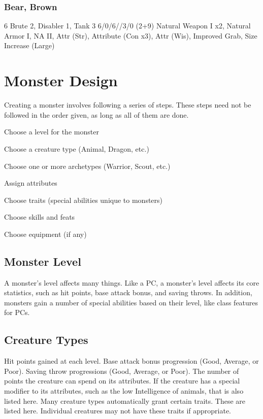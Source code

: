 \subsubsection{Bear, Brown}
 6
 Brute 2, Disabler 1, Tank 3
 6/0/6//3/0
 (2+9) Natural Weapon I x2, Natural Armor I, NA II, Attr (Str), Attribute (Con x3), Attr (Wis), Improved Grab, Size Increase (Large)

\section{Monster Design}

Creating a monster involves following a series of steps. These steps need not be followed in the order given, as long as all of them are done.

\begin{enumerate*}
    \item Choose a level for the monster
    \item Choose a creature type (Animal, Dragon, etc.)
    \item Choose one or more archetypes (Warrior, Scout, etc.)
    \item Assign attributes
    \item Choose traits (special abilities unique to monsters)
    \item Choose skills and feats
    \item Choose equipment (if any)
\end{enumerate*}

\subsection{Monster Level}
A monster's level affects many things. Like a PC, a monster's level affects its core statistics, such as hit points, base attack bonus, and saving throws. In addition, monsters gain a number of special abilities based on their level, like class features for PCs.

\subsection{Creature Types}
\thv Hit points gained at each level.
\tbab Base attack bonus progression (Good, Average, or Poor).
\tsaves Saving throw progressions (Good, Average, or Poor).
 The number of points the creature can spend on its attributes. If the creature has a special modifier to its attributes, such as the low Intelligence of animals, that is also listed here.
 Many creature types automatically grant certain traits. These are listed here. Individual creatures may not have these traits if appropriate.

